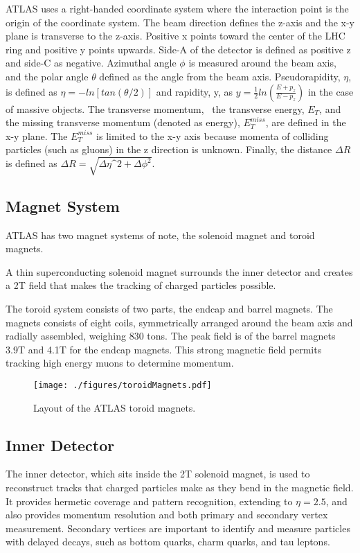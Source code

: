 ATLAS uses a right-handed coordinate system where the interaction point is the origin of the coordinate system.  The beam direction defines the z-axis and the x-y plane is transverse to the z-axis.  Positive x points toward the center of the LHC ring and positive y points upwards.  Side-A of the detector is defined as positive z and side-C as negative.  Azimuthal angle $\phi$ is measured around the beam axis, and the polar angle $\theta$ defined as the angle from the beam axis.  Pseudorapidity, $\eta$, is defined as $\eta = -ln[tan(\theta/2)]$ and rapidity, y, as $y=\frac{1}{2} ln(\frac{E+p_{z}}{E-p_{z}})$ in the case of massive objects.  The transverse momentum, \pt\,  the transverse energy, $E_{T}$, and the missing transverse momentum (denoted as energy), $E_{T}^{miss}$, are defined in the x-y plane.  The $E_{T}^{miss}$ is limited to the x-y axis because momenta of colliding particles (such as gluons) in the z direction is unknown.  Finally, the distance $\Delta R$ is defined as $\Delta R = \sqrt{\Delta\eta\^{2} + \Delta\phi^{2}}$.

\subsection{Magnet System}

ATLAS has two magnet systems of note, the solenoid magnet and toroid magnets.

A thin superconducting solenoid magnet surrounds the inner detector and creates a 2T field that makes the tracking of charged particles possible.  

The toroid system consists of two parts, the endcap and barrel magnets.  The magnets consists of eight coils, symmetrically arranged around the beam axis and radially assembled, weighing 830 tons.  The peak field is of the barrel magnets 3.9T and 4.1T for the endcap magnets.  This strong magnetic field permits tracking high energy muons to determine momentum.

\begin{figure}[h!]
  \centering
	\texttt{[image: ./figures/toroidMagnets.pdf]}
\caption{\label{fig:atlasToroids}{ Layout of the ATLAS toroid magnets. }} %
\end{figure}

\subsection{Inner Detector}

The inner detector, which sits inside the 2T solenoid magnet, is used to reconstruct tracks that charged particles make as they bend in the magnetic field.  It provides hermetic coverage and pattern recognition, extending to $\eta=2.5$, and also provides momentum resolution and both primary and secondary vertex measurement.  Secondary vertices are important to identify and measure particles with delayed decays, such as bottom quarks, charm quarks, and tau leptons.  

